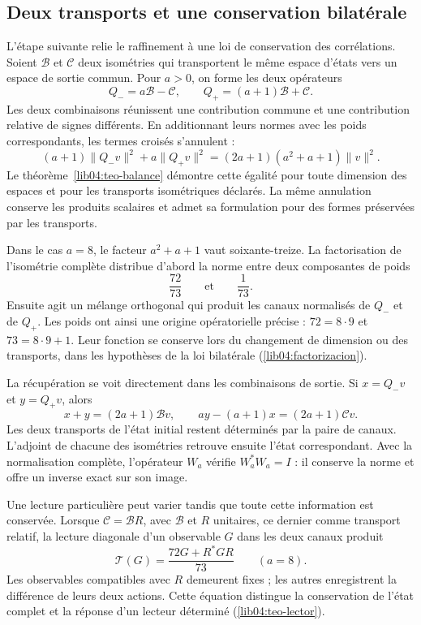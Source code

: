 \subsection*{Deux transports et une conservation bilatérale}
\label{libnar:bilateral}

L’étape suivante relie le raffinement à une loi de
conservation des corrélations. Soient \(\mathcal B\) et
\(\mathcal C\) deux isométries qui transportent le même espace
d’états vers un espace de sortie commun. Pour \(a>0\), on forme les
deux opérateurs
\[
 Q_-=a\mathcal B-\mathcal C,\qquad
 Q_+=(a+1)\mathcal B+\mathcal C.
\]
Les deux combinaisons réunissent une contribution commune et une
contribution relative de signes différents. En additionnant leurs normes
avec les poids correspondants, les termes croisés s’annulent :
\[
 (a+1)\|Q_-v\|^2+a\|Q_+v\|^2
   =(2a+1)(a^2+a+1)\|v\|^2.
\]
Le théorème~\ref{lib04:teo-balance} démontre cette égalité pour toute dimension des espaces et pour les transports isométriques déclarés. La même annulation conserve les produits scalaires et admet sa formulation pour des formes préservées par les transports.

Dans le cas \(a=8\), le facteur \(a^2+a+1\) vaut soixante-treize.
La factorisation de l’isométrie complète distribue d’abord la
norme entre deux composantes de poids
\[
 \frac{72}{73}\qquad\text{et}\qquad\frac{1}{73}.
\]
Ensuite agit un mélange orthogonal qui produit les canaux
normalisés de \(Q_-\) et de \(Q_+\). Les poids ont ainsi une
origine opératorielle précise : \(72=8\cdot9\) et
\(73=8\cdot9+1\). Leur fonction se conserve lors du changement de dimension
ou des transports, dans les hypothèses de la loi bilatérale
(\cref{lib04:factorizacion}).

La récupération se voit directement dans les combinaisons de sortie. Si \(x=Q_-v\) et \(y=Q_+v\), alors
\[
 x+y=(2a+1)\mathcal Bv,\qquad
 ay-(a+1)x=(2a+1)\mathcal Cv.
\]
Les deux transports de l’état initial restent déterminés par
la paire de canaux. L’adjoint de chacune des isométries
retrouve ensuite l’état correspondant. Avec la normalisation
complète, l’opérateur \(W_a\) vérifie \(W_a^*W_a=I\) :
il conserve la norme et offre un inverse exact sur son image.

Une lecture particulière peut varier tandis que toute cette information est conservée. Lorsque \(\mathcal C=\mathcal B R\), avec \(\mathcal B\) et \(R\) unitaires, ce dernier comme transport relatif, la lecture diagonale d'un observable \(G\) dans les deux canaux produit
\[
 \mathcal T(G)=\frac{72G+R^*GR}{73}
 \qquad(a=8).
\]
Les observables compatibles avec \(R\) demeurent fixes ; les autres
enregistrent la différence de leurs deux actions. Cette équation distingue
la conservation de l’état complet et la réponse d’un lecteur
déterminé (\cref{lib04:teo-lector}).


